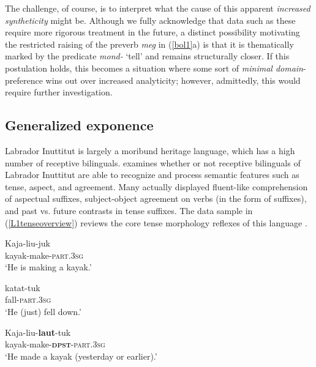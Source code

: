 \documentclass[output=paper,colorlinks,citecolor=brown,footheight=42pt]{langscibook}
\begin{document}
The challenge, of course, is to interpret what the cause of this apparent \textit{increased syntheticity} might be. Although we fully acknowledge that data such as these require more rigorous treatment in the future, a distinct possibility motivating the restricted raising of the preverb \textit{meg} in (\ref{bol1}a) is that it is thematically marked by the predicate \textit{mond-} `tell' and remains structurally closer. If this postulation holds, this becomes a situation where some sort of \textit{minimal domain}-preference wins out over increased analyticity; however, admittedly, this would require further investigation. 

\subsection{Generalized exponence} \label{weaksub}
\begin{sloppypar}
Labrador Inuttitut is largely a moribund heritage language, which has a high number of receptive bilinguals. \citet{sherkinalieber2015} examines whether or not receptive bilinguals of Labrador Inuttitut are able to recognize and process semantic features such as tense, aspect, and agreement. Many actually displayed fluent-like comprehension of aspectual suffixes, subject-object agreement on verbs (in the form of suffixes), and past vs. future contrasts in tense suffixes. The data sample in (\ref{L1tenseoverview}) reviews the core tense morphology reflexes of this language \citep[36]{sherkinalieber2015}.
\end{sloppypar}

\begin{exe}
\ex \label{L1tenseoverview}
\begin{xlist}
\ex \gll Kaja-liu-juk \\
     kayak-make-\textsc{part.3sg} \\
     \glt `He is making a kayak.' 
     
\ex \gll katat-tuk \\
         fall-\textsc{part.3sg} \\
    \glt `He (just) fell down.' 
    
\ex \gll Kaja-liu-\textbf{laut}-tuk \\
         kayak-make-\textsc{\textbf{dpst}-part.3sg} \\
    \glt `He made a kayak (yesterday or earlier).' 

\end{xlist}
\end{exe}
\end{document}

